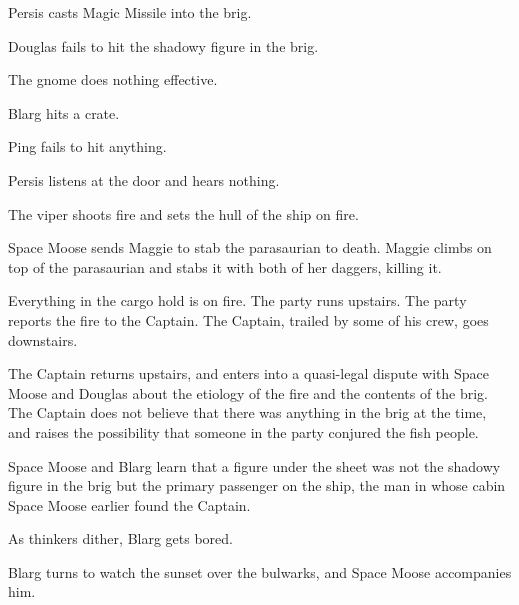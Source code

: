 \documentclass{article}
\begin{document}
Persis casts Magic Missile into the brig.

Douglas fails to hit the shadowy figure in the brig.

The gnome does nothing effective.

Blarg hits a crate.

Ping fails to hit anything.

Persis listens at the door and hears nothing.

The viper shoots fire and sets the hull of the ship on fire.

Space Moose sends Maggie to stab the parasaurian to death. Maggie climbs on top of the parasaurian and stabs it with both of her daggers, killing it.

Everything in the cargo hold is on fire. The party runs upstairs. The party reports the fire to the Captain. The Captain, trailed by some of his crew, goes downstairs.

The Captain returns upstairs, and enters into a quasi-legal dispute with Space Moose and Douglas about the etiology of the fire and the contents of the brig. The Captain does not believe that there was anything in the brig at the time, and raises the possibility that someone in the party conjured the fish people. 

Space Moose and Blarg learn that a figure under the sheet was not the shadowy figure in the brig but the primary passenger on the ship, the man in whose cabin Space Moose earlier found the Captain.

As thinkers dither, Blarg gets bored.

Blarg turns to watch the sunset over the bulwarks, and Space Moose accompanies him.
\end{document}
